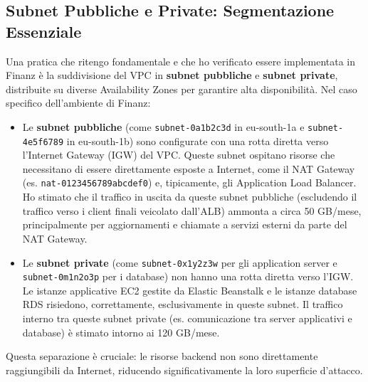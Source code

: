 \subsection{Subnet Pubbliche e Private: Segmentazione Essenziale}
\label{subsec:subnets_cap2}
Una pratica che ritengo fondamentale e che ho verificato essere implementata in Finanz è la suddivisione del VPC in \textbf{subnet pubbliche} e \textbf{subnet private}, distribuite su diverse Availability Zones per garantire alta disponibilità. Nel caso specifico dell'ambiente di Finanz:
\begin{itemize}
    \item Le \textbf{subnet pubbliche} (come \texttt{subnet-0a1b2c3d} in eu-south-1a e \texttt{subnet-4e5f6789} in eu-south-1b) sono configurate con una rotta diretta verso l'Internet Gateway (IGW) del VPC. Queste subnet ospitano risorse che necessitano di essere direttamente esposte a Internet, come il NAT Gateway (es. \texttt{nat-0123456789abcdef0}) e, tipicamente, gli Application Load Balancer. Ho stimato che il traffico in uscita da queste subnet pubbliche (escludendo il traffico verso i client finali veicolato dall'ALB) ammonta a circa 50 GB/mese, principalmente per aggiornamenti e chiamate a servizi esterni da parte del NAT Gateway.
    \item Le \textbf{subnet private} (come \texttt{subnet-0x1y2z3w} per gli application server e \texttt{subnet-0m1n2o3p} per i database) non hanno una rotta diretta verso l'IGW. Le istanze applicative EC2 gestite da Elastic Beanstalk e le istanze database RDS risiedono, correttamente, esclusivamente in queste subnet. Il traffico interno tra queste subnet private (es. comunicazione tra server applicativi e database) è stimato intorno ai 120 GB/mese.
\end{itemize}
Questa separazione è cruciale: le risorse backend non sono direttamente raggiungibili da Internet, riducendo significativamente la loro superficie d'attacco.

